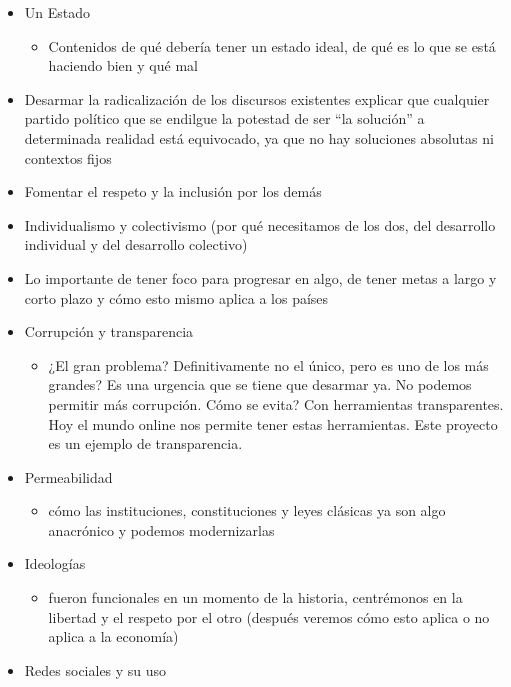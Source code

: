 \documentclass[
]{book}
\providecommand{\tightlist}{%
  \setlength{\itemsep}{0pt}\setlength{\parskip}{0pt}}
\begin{document}
\begin{itemize}
\tightlist
\item
  Un Estado

  \begin{itemize}
  \tightlist
  \item
    Contenidos de qué debería tener un estado ideal, de qué es lo que se está haciendo bien y qué mal
  \end{itemize}
\item
  Desarmar la radicalización de los discursos existentes explicar que cualquier partido político que se endilgue la potestad de ser ``la solución'' a determinada realidad está equivocado, ya que no hay soluciones absolutas ni contextos fijos
\item
  Fomentar el respeto y la inclusión por los demás
\item
  Individualismo y colectivismo (por qué necesitamos de los dos, del desarrollo individual y del desarrollo colectivo)
\item
  Lo importante de tener foco para progresar en algo, de tener metas a largo y corto plazo y cómo esto mismo aplica a los países
\item
  Corrupción y transparencia

  \begin{itemize}
  \tightlist
  \item
    ¿El gran problema? Definitivamente no el único, pero es uno de los más grandes? Es una urgencia que se tiene que desarmar ya. No podemos permitir más corrupción. Cómo se evita? Con herramientas transparentes. Hoy el mundo online nos permite tener estas herramientas. Este proyecto es un ejemplo de transparencia.
  \end{itemize}
\item
  Permeabilidad

  \begin{itemize}
  \tightlist
  \item
    cómo las instituciones, constituciones y leyes clásicas ya son algo anacrónico y podemos modernizarlas
  \end{itemize}
\item
  Ideologías

  \begin{itemize}
  \tightlist
  \item
    fueron funcionales en un momento de la historia, centrémonos en la libertad y el respeto por el otro (después veremos cómo esto aplica o no aplica a la economía)
  \end{itemize}
\item
  Redes sociales y su uso


\end{itemize}
\end{document}
